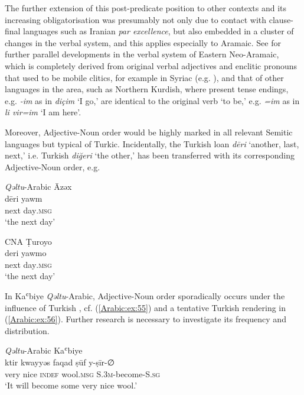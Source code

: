 \documentclass[output=paper,colorlinks,citecolor=brown,draftmode]{langscibook}
\begin{document}
The further extension of this post-predicate position to other contexts and its increasing obligatorisation was presumably not only due to contact with clause-final  languages such as Iranian \textit{par excellence}, but also embedded in a cluster of changes in the verbal system, and this applies especially to Aramaic. See \citet{NoorlanderandStilo2015} for further parallel developments in the verbal system of Eastern Neo-Aramaic, which is completely derived from original verbal adjectives and enclitic pronouns that used to be mobile clitics, for example in Syriac (e.g. \citealt[15]{Noorlander2018Alignment}), and that of other languages in the area, such as Northern Kurdish, where present tense endings, e.g. \textit{-im} as in \textit{diçim} `I go,' are identical to the original verb `to be,' e.g. \textit{=im} as in \textit{li vir=im} `I am here'.

\begin{sloppypar}
Moreover, Adjective-Noun order would be highly marked in all relevant Semitic languages but typical of Turkic. Incidentally, the Turkish loan  \textit{dēri} `another, last, next,' i.e. Turkish \textit{diğeri} `the other,' has been transferred with its corresponding Adjective-Noun order, e.g. 
\end{sloppypar}

\ea\label{Arabic:ex:53}
\textit{Qəltu}-Arabic Āzəx \citep[121]{Wittrich2001AAzex} \\
\gll dēri yawm \\
next day\textsc{.msg} \\
\glt `the next day'
\z

\ea\label{Arabic:ex:54}
CNA Ṭuroyo\\
\gll deri yawmo \\
next day\textsc{.msg}\\
\glt `the next day'
\z

In Kaʿbiye \textit{Qəltu}-Arabic, Adjective-Noun order sporadically occurs under the influence of Turkish \citep[7–8]{Jastrow2022CADiyarbakir}, cf. (\ref{Arabic:ex:55}) and a tentative Turkish rendering in (\ref{Arabic:ex:56}). Further research is necessary to investigate its frequency and distribution.

\ea\label{Arabic:ex:55}
\textit{Qəltu}-Arabic Kaʿbiye \citep[VI:§45]{Jastrow2022CADiyarbakir} \\
\gll ktir kwayyəs faqad ṣūf y-ṣīr-∅ \\
very nice \textsc{indef} wool\textsc{.msg} \textsc{S.3m-}become\textsc{-S.sg} \\
\glt `It will become some very nice wool.'
\z
\end{document}
